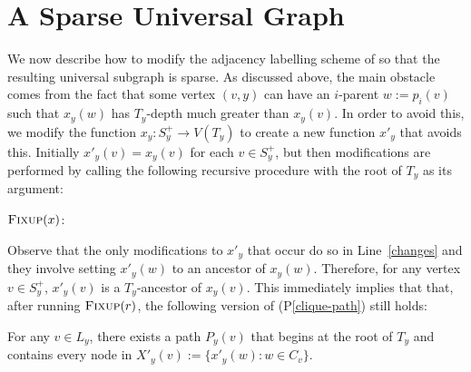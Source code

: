 \documentclass{patmorin}
\newcommand{\pref}[1]{(P\ref{#1})}
\begin{document}
\section{A Sparse Universal Graph}
\label{modifications}

We now describe how to modify the adjacency labelling scheme of \citet{dujmovic.esperet.ea:adjacency} so that the resulting universal subgraph is sparse.  As discussed above, the main obstacle comes from the fact that some vertex $(v,y)$ can have an $i$-parent $w:=p_i(v)$ such that $x_y(w)$ has $T_y$-depth much greater than $x_y(v)$.  In order to avoid this, we modify the function $x_y:S^+_y\to V(T_y)$ to create a new function $x'_y$ that avoids this. Initially $x'_y(v)=x_y(v)$ for each $v\in S^+_y$, but then modifications are performed by calling the following recursive procedure with the root of $T_y$ as its argument:

\noindent
\begin{minipage}{\textwidth}
    $\textsc{Fixup}(x)$:
    \begin{algorithmic}[1]
                \ENDIF
            \ENDFOR
        \ENDFOR
    \end{algorithmic}
\end{minipage}


Observe that the only modifications to $x'_y$ that occur do so in Line~\ref{changes} and they involve setting $x'_y(w)$ to an ancestor of $x_y(w)$.  Therefore, for any vertex $v\in S^+_y$, $x'_y(v)$ is a $T_y$-ancestor of $x_y(v)$.  This immediately implies that that, after running $\textsc{Fixup}(r)$, the following version of \pref{clique-path} still holds:

\begin{compactenum}[(P1$^\star$)]\setcounter{enumi}{1}
    \item For any $v\in L_y$, there exists a path $P_y(v)$ that begins at the root of $T_y$ and contains every node in $X'_y(v):=\{x'_{y}(w): w\in C_v\}$.\label{clique-path-ii}
\end{compactenum}
\end{document}
